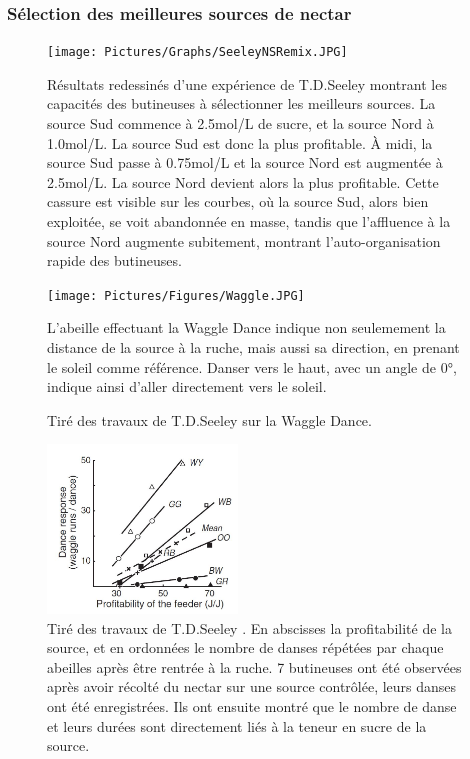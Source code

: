 			\subsubsection{Sélection des meilleures sources de nectar}
			
			\begin{figure}
			\centering
			\texttt{[image: Pictures/Graphs/SeeleyNSRemix.JPG]}
				\caption[Résultats redessinés d'une expérience de T.D.Seeley \cite{seeley_collective_1991} montrant les capacités des butineuses à sélectionner les meilleurs sources.]{Résultats redessinés d'une expérience de T.D.Seeley \cite{seeley_collective_1991} montrant les capacités des butineuses à sélectionner les meilleurs sources. La source Sud commence à 2.5mol/L de sucre, et la source Nord à 1.0mol/L. La source Sud est donc la plus profitable. À midi, la source Sud passe à 0.75mol/L et la source Nord est augmentée à 2.5mol/L. La source Nord devient alors la plus profitable. Cette cassure est visible sur les courbes, où la source Sud, alors bien exploitée, se voit abandonnée en masse, tandis que l’affluence à la source Nord augmente subitement, montrant l’auto-organisation rapide des butineuses.}
			\label{SeeleyNS}
			\end{figure}
			
			\begin{figure}
			\centering
			\texttt{[image: Pictures/Figures/Waggle.JPG]}
				\caption{Tiré des travaux de T.D.Seeley \cite{seeley_wisdom_1995} sur la Waggle Dance.}{ L'abeille effectuant la Waggle Dance indique non seulemement la distance de la source à la ruche, mais aussi sa direction, en prenant le soleil comme référence. Danser vers le haut, avec un angle de 0°, indique ainsi d'aller directement vers le soleil.}
			\label{Waggle}
			\end{figure}
			
			
	\begin{figure}
	\centering
	\includegraphics[width=0.45\textwidth]{Pictures/Graphs/SeeleyWaggles.JPG}
	\caption[Tiré des travaux de T.D.Seeley \cite{seeley_wisdom_1995}. En abscisses la profitabilité de la source, et en ordonnées le nombre de danses répétées par chaque abeilles après être rentrée à la ruche.]{Tiré des travaux de T.D.Seeley \cite{seeley_wisdom_1995}. En abscisses la profitabilité de la source, et en ordonnées le nombre de danses répétées par chaque abeilles après être rentrée à la ruche. 7 butineuses ont été observées après avoir récolté du nectar sur une source contrôlée, leurs danses ont été enregistrées. Ils ont ensuite montré que le nombre de danse et leurs durées sont directement liés à la teneur en sucre de la source.}
	\label{SeeleyWaggles}
	\end{figure}
	
